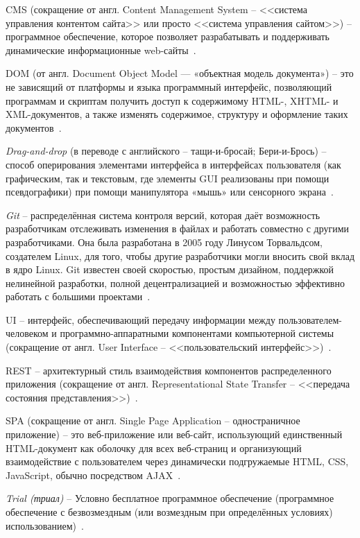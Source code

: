 CMS (сокращение от англ. Content Management System -- <<система управления контентом сайта>> или просто <<система управления сайтом>>) -- программное обеспечение, которое позволяет разрабатывать и поддерживать динамические информационные web-сайты~\cite{cms}.

DOM (от англ. Document Object Model — «объектная модель документа») -- это не зависящий от платформы и языка программный интерфейс, позволяющий программам и скриптам получить доступ к содержимому HTML-, XHTML- и XML-документов, а также изменять содержимое, структуру и оформление таких документов~\cite{wiki_dom}.

\emph{Drag-and-drop} (в переводе с английского -- тащи-и-бросай; Бери-и-Брось) -- способ оперирования элементами интерфейса в интерфейсах пользователя (как графическим, так и текстовым, где элементы GUI реализованы при помощи псевдографики) при помощи манипулятора «мышь» или сенсорного экрана~\cite{wiki_dnd}.

\emph{Git} -- распределённая система контроля версий, которая даёт возможность разработчикам отслеживать изменения в файлах и работать совместно с другими разработчиками. Она была разработана в 2005 году Линусом Торвальдсом, создателем Linux, для того, чтобы другие разработчики могли вносить свой вклад в ядро Linux. Git известен своей скоростью, простым дизайном, поддержкой нелинейной разработки, полной децентрализацией и возможностью эффективно работать с большими проектами~\cite{git}.

UI --  интерфейс, обеспечивающий передачу информации между пользователем-человеком и программно-аппаратными компонентами компьютерной системы (сокращение от англ.  User Interface -- <<пользовательский интерфейс>>)~\cite{wiki_ui}.

REST -- архитектурный стиль взаимодействия компонентов распределенного приложения (сокращение от англ. Representational State Transfer -- <<передача состояния представления>>)~\cite{wiki_rest}.

SPA (сокращение от англ. Single Page Application -- одностраничное приложение) -- это веб-приложение или веб-сайт, использующий единственный HTML-документ как оболочку для всех веб-страниц и организующий взаимодействие с пользователем через динамически подгружаемые HTML, CSS, JavaScript, обычно посредством AJAX~\cite{wiki_spa}.

\emph{Trial (триал)} -- Условно бесплатное программное обеспечение (программное обеспечение с безвозмездным (или возмездным при определённых условиях) использованием)~\cite{wiki_trial}.

